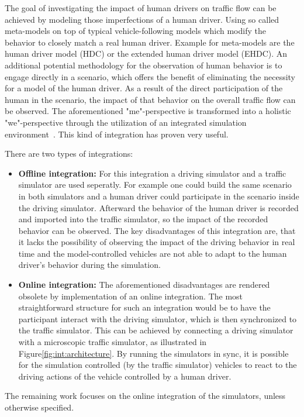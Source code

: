         The goal of investigating the impact of human drivers on traffic flow can be achieved by modeling those imperfections of a human driver.
        Using so called meta-models on top of  typical vehicle-following models which modify the behavior to closely match a real human driver.
        Example for meta-models are the human driver model (HDC)\cite{treiber2006delays} or the extended human driver model (EHDC)\cite{Lindorfer2018}.
        An additional potential methodology for the observation of human behavior is to engage directly in a scenario, which offers the benefit of eliminating the necessity for a model of the human driver.
        As a result of the direct participation of the human in the scenario, the impact of that behavior on the overall traffic flow can be observed.
        The aforementioned "me"-perspective is transformed into a holistic "we"-perspective through the utilization of an integrated simulation environment~\cite{riegler2023}.
        This kind of integration has proven very useful\cite{punzo2010integration}.

        There are two types of integrations:
        \begin{itemize}
            \item \textbf{Offline integration:} For this integration a driving simulator and a traffic simulator are used seperatly.
            For example one could build the same scenario in both simulators and a human driver could participate in the scenario inside the driving simulator.
            Afterward the behavior of the human driver is recorded and imported into the traffic simulator, so the impact of the recorded behavior can be observed.
            The key disadvantages of this integration are, that it lacks the possibility of observing the impact of the driving behavior in real time and the model-controlled vehicles are not able to adapt to the human driver's behavior during the simulation.
            \item \textbf{Online integration:} The aforementioned disadvantages are rendered obsolete by implementation of an online integration.
            The most straightforward structure for such an integration would be to have the participant interact with the driving simulator, which is then synchronized to the traffic simulator.
            This can be achieved by connecting a driving simulator with a microscopic traffic simulator, as illustrated in Figure\ref{fig:int:architecture}.
            By running the simulators in sync, it is possible for the simulation controlled (by the traffic simulator) vehicles to react to the driving actions of the vehicle controlled by a human driver.
        \end{itemize}
        The remaining work focuses on the online integration of the simulators, unless otherwise specified.

